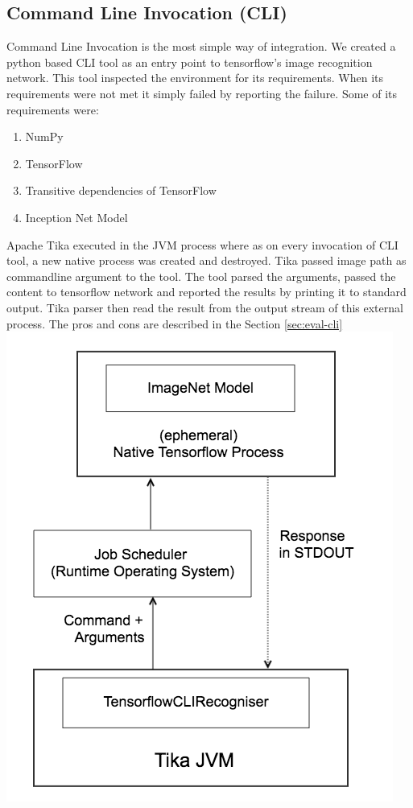 \documentclass[letterpaper, 10 pt, conference]{ieeeconf}  %
\begin{document}
\subsection{Command Line Invocation (CLI)} \label{sec:int-cli}
Command Line Invocation is the most simple way of integration. We created a python based CLI tool as an entry point to tensorflow's image recognition network. This tool inspected the environment for its requirements. When its requirements were not met it simply failed by reporting the failure. Some of its requirements were: 
\begin{enumerate}
\item NumPy
\item TensorFlow
\item Transitive dependencies of TensorFlow
\item Inception Net Model
\end{enumerate}
Apache Tika executed in the JVM process where as on every invocation of CLI tool, a new native process was created and destroyed.  Tika passed image path as commandline argument to the tool. The tool parsed the arguments, passed the content to tensorflow network and reported the results by printing it to standard output.  Tika parser then read the result from the output stream of this external process. The pros and cons are described in the Section \ref{sec:eval-cli}
\includegraphics[scale=0.40]{tika-tflow-cli-design}
\end{document}
